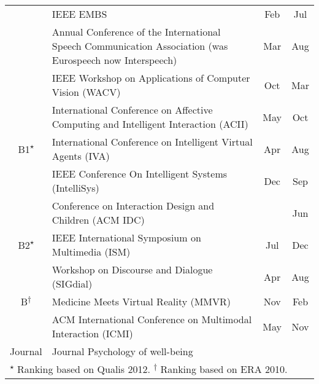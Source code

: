 \begin{sidewaystable}[]
\begin{tabular}{c  m{16cm}  c  c}
                                  & IEEE EMBS                                                                                                & Feb                & Jul        \\ \cmidrule{2-4}
                                  & Annual Conference of the International Speech Communication Association (was Eurospeech now Interspeech) & Mar                & Aug        \\ \cmidrule{2-4}
                                  & IEEE Workshop on Applications of Computer Vision (WACV)                                                  & Oct                & Mar        \\ 
\midrule
\multirow{3}{*}{B1\textsuperscript{$\star$}}               & International Conference on Affective Computing and Intelligent Interaction (ACII)                       & May                & Oct        \\ \cmidrule{2-4}
                                  & International Conference on Intelligent Virtual Agents (IVA)                                             & Apr                & Aug        \\ \cmidrule{2-4}
                                  & IEEE Conference On Intelligent Systems (IntelliSys)                                                      & Dec                & Sep        \\ 
\midrule
\multirow{3}{*}{B2\textsuperscript{$\star$}}               & Conference on Interaction Design and Children (ACM IDC)                                                  &                    & Jun        \\ \cmidrule{2-4}
                                  & IEEE International Symposium on Multimedia (ISM)                                                         & Jul                & Dec        \\ \cmidrule{2-4}
                                  & Workshop on Discourse and Dialogue (SIGdial)                                                             & Apr                & Aug        \\ 
\midrule
B\textsuperscript{$\dagger$}                                 & Medicine Meets Virtual Reality (MMVR)                                                                    & Nov                & Feb        \\ \cmidrule{2-4}
                                  & ACM International Conference on Multimodal Interaction (ICMI)                                            & May                & Nov        \\ 
\midrule
Journal                           & Journal Psychology of well-being                                                                         &                    &           \\ 
\midrule[\heavyrulewidth]

\multicolumn{4}{l}{\footnotesize{\textsuperscript{$\star$} Ranking based on Qualis 2012. \textsuperscript{$\dagger$} Ranking based on ERA 2010.}} \\
	\bottomrule

\end{tabular}
\end{sidewaystable}


